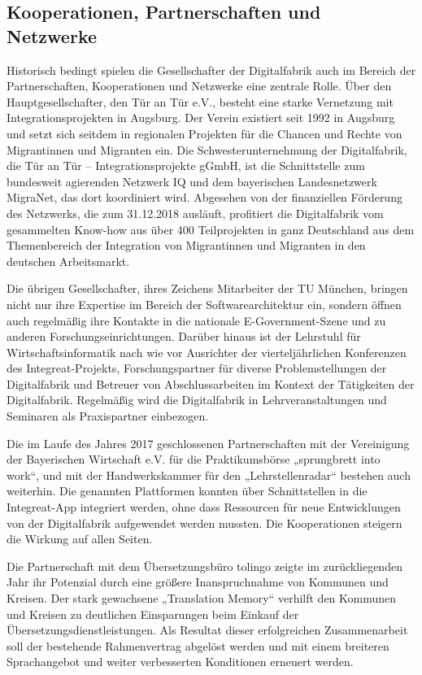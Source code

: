 \documentclass[12pt, a4paper]{article} %
\begin{document}
\hypertarget{kooperationen-partnerschaften-und-netzwerke}{%
\subsection{Kooperationen, Partnerschaften und
Netzwerke}\label{kooperationen-partnerschaften-und-netzwerke}}

Historisch bedingt spielen die Gesellschafter der Digitalfabrik auch im
Bereich der Partnerschaften, Kooperationen und Netzwerke eine zentrale
Rolle. Über den Hauptgesellschafter, den Tür an Tür e.V., besteht eine
starke Vernetzung mit Integrationsprojekten in Augsburg. Der Verein
existiert seit 1992 in Augsburg und setzt sich seitdem in regionalen
Projekten für die Chancen und Rechte von Migrantinnen und Migranten ein.
Die Schwesterunternehmung der Digitalfabrik, die Tür an Tür –
Integrationsprojekte gGmbH, ist die Schnittstelle zum bundesweit
agierenden Netzwerk IQ und dem bayerischen Landesnetzwerk MigraNet, das
dort koordiniert wird. Abgesehen von der finanziellen Förderung des
Netzwerks, die zum 31.12.2018 ausläuft, profitiert die Digitalfabrik vom
gesammelten Know-how aus über 400 Teilprojekten in ganz Deutschland aus
dem Themenbereich der Integration von Migrantinnen und Migranten in den
deutschen Arbeitsmarkt.

Die übrigen Gesellschafter, ihres Zeichens Mitarbeiter der TU München,
bringen nicht nur ihre Expertise im Bereich der Softwarearchitektur ein,
sondern öffnen auch regelmäßig ihre Kontakte in die nationale
E-Government-Szene und zu anderen Forschungseinrichtungen. Darüber
hinaus ist der Lehrstuhl für Wirtschaftsinformatik nach wie vor
Ausrichter der vierteljährlichen Konferenzen des Integreat-Projekts,
Forschungspartner für diverse Problemstellungen der Digitalfabrik und
Betreuer von Abschlussarbeiten im Kontext der Tätigkeiten der
Digitalfabrik. Regelmäßig wird die Digitalfabrik in Lehrveranstaltungen
und Seminaren als Praxispartner einbezogen.

Die im Laufe des Jahres 2017 geschlossenen Partnerschaften mit der
Vereinigung der Bayerischen Wirtschaft e.V. für die Praktikumsbörse
„sprungbrett into work“, und mit der Handwerkskammer für den
„Lehrstellenradar“ bestehen auch weiterhin. Die genannten Plattformen
konnten über Schnittstellen in die Integreat-App integriert werden, ohne
dass Ressourcen für neue Entwicklungen von der Digitalfabrik aufgewendet
werden mussten. Die Kooperationen steigern die Wirkung auf allen Seiten.

Die Partnerschaft mit dem Übersetzungsbüro tolingo zeigte im
zurückliegenden Jahr ihr Potenzial durch eine größere Inanspruchnahme
von Kommunen und Kreisen. Der stark gewachsene „Translation Memory“
verhilft den Kommunen und Kreisen zu deutlichen Einsparungen beim
Einkauf der Übersetzungsdienstleistungen. Als Resultat dieser
erfolgreichen Zusammenarbeit soll der bestehende Rahmenvertrag abgelöst
werden und mit einem breiteren Sprachangebot und weiter verbesserten
Konditionen erneuert werden.
\end{document}
